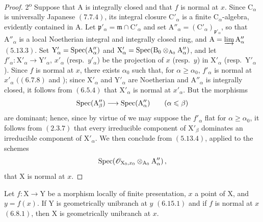 \begin{proof}
2\textsuperscript{o} Suppose that $\mathrm{A}$ is integrally closed and that $f$ is normal at $x$. Since $\mathrm{C}_\alpha$ is universally Japanese $(7.7.4)$, its integral closure $\mathrm{C}'_\alpha$ is a finite $\mathrm{C}_\alpha$-algebra, evidently contained in $\mathrm{A}$. Let $\mathfrak{p}'_\alpha=\mathfrak{m}\cap\mathrm{C}'_\alpha$ and set $\mathrm{A}''_\alpha=(\mathrm{C}'_\alpha)_{\mathfrak{p}'_\alpha}$, so that $\mathrm{A}''_\alpha$ is a local Noetherian integral and integrally closed ring, and $\mathrm{A}=\varinjlim\mathrm{A}''_\alpha$ $(5.13.3)$. Set $\mathrm{Y}'_\alpha=\operatorname{Spec}(\mathrm{A}''_\alpha)$ and $\mathrm{X}'_\alpha=\operatorname{Spec}(\mathrm{B}_0\otimes_{\mathrm{A}_0}\mathrm{A}''_\alpha)$, and let $f'_\alpha:\mathrm{X}'_\alpha\to\mathrm{Y}'_\alpha$, $x'_\alpha$ (resp.\ $y'_\alpha$) be the projection of $x$ (resp.\ $y$) in $\mathrm{X}'_\alpha$ (resp.\ $\mathrm{Y}'_\alpha$). Since $f$ is normal at $x$, there exists $\alpha_0$ such that, for $\alpha\geqslant\alpha_0$, $f'_\alpha$ is normal at $x'_\alpha$ $((6.7.8)$ and );  since $\mathrm{X}'_\alpha$ and $\mathrm{Y}'_\alpha$ are Noetherian and $\mathrm{A}''_\alpha$ is integrally closed, it follows from $(6.5.4)$ that $\mathrm{X}'_\alpha$ is normal at $x'_\alpha$. But the morphisms
\[
  \operatorname{Spec}(\mathrm{A}''_\beta)\longrightarrow\operatorname{Spec}(\mathrm{A}''_\alpha)
  \qquad(\alpha\leqslant\beta)
\]
are dominant; hence, since by virtue of  we may suppose the $f'_\alpha$ flat for $\alpha\geqslant\alpha_0$, it follows from $(2.3.7)$ that every irreducible component of $\mathrm{X}'_\beta$ dominates an irreducible component of $\mathrm{X}'_\alpha$. We then conclude from $(5.13.4)$, applied to the schemes
\[
  \operatorname{Spec}\!\left(\mathscr{O}_{\mathrm{X}_0,x_0}\otimes_{\mathrm{A}_0}\mathrm{A}''_\alpha\right),
\]
that $\mathrm{X}$ is normal at $x$.
\end{proof}

\begin{corollary}[11.3.14]
\label{IV.11.3.14}
Let $f:\mathrm{X}\to\mathrm{Y}$ be a morphism locally of finite presentation, $x$ a point of $\mathrm{X}$, and $y=f(x)$. If $\mathrm{Y}$ is geometrically unibranch at $y$ $(6.15.1)$ and if $f$ is normal at $x$ $(6.8.1)$, then $\mathrm{X}$ is geometrically unibranch at $x$.
\end{corollary}


